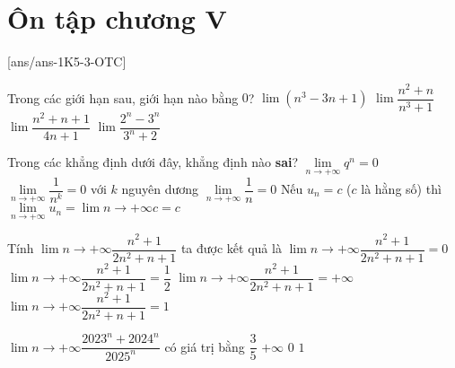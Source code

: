 \section{Ôn tập chương V}
[ans/ans-1K5-3-OTC]
\begin{ex}%
	Trong các giới hạn sau, giới hạn nào bằng $ 0 $?
	\choice
	{$ \lim(n^3-3n+1) $}
	{\True $ \lim\dfrac{n^2+n}{n^3+1} $}
	{$ \lim\dfrac{n^2+n+1}{4n+1} $}
	{$ \lim\dfrac{2^n-3^n}{3^n+2} $}
\end{ex}
\begin{ex}%
	Trong các khẳng định dưới đây, khẳng định nào \textbf{sai}?
	\choice
	{\True $\lim\limits_{n \to +\infty} q^n=0$}
	{$\lim\limits_{n \to +\infty} \dfrac{1}{n^k}=0$ với $k$ nguyên dương}
	{$\lim\limits_{n \to +\infty} \dfrac{1}{n}=0$}
	{Nếu $u_n=c$ ($c$ là hằng số) thì $\lim\limits_{n \to +\infty} u_n=\lim \limits{n \to +\infty}c=c$}
\end{ex}

\begin{ex}%
	Tính $\lim \limits{n \to +\infty}\dfrac{n^2+1}{2n^2+n+1}$ ta được kết quả là
	\choice
	{$\lim \limits{n \to +\infty}\dfrac{n^2+1}{2n^2+n+1}=0$}
	{\True $\lim \limits{n \to +\infty}\dfrac{n^2+1}{2n^2+n+1}=\dfrac{1}{2}$}
	{$\lim \limits{n \to +\infty}\dfrac{n^2+1}{2n^2+n+1}=+\infty $}
	{$\lim \limits{n \to +\infty}\dfrac{n^2+1}{2n^2+n+1}=1$}
\end{ex}

\begin{ex}%
	$\lim \limits{n \to +\infty}\dfrac{2023^n+2024^n}{2025^n}$ có giá trị bằng
	\choice
	{$\dfrac{3}{5}$}
	{$+\infty$}
	{\True $0$}
	{$1$}
\end{ex}


